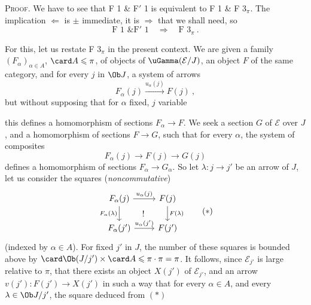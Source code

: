 \textsc{Proof}. We have to see that F 1 \& F$'$ 1 is equivalent to F 1 \& F $3_\pi$. The implication $\Longleftarrow$ is $\pm$ immediate, it is $\Longrightarrow$ that we shall need, so
\[
\text{F 1 \& F}'\text{ 1} \quad\Longrightarrow\quad \text{F } 3_\pi\ .
\]

For this, let us restate F $3_\pi$ in the present context. We are given a family $(F_\alpha)_{\alpha\in A}$, $\card A\leqslant\pi$, of objects of $\uGamma(\mathcal{E}/J)$, an object $F$ of the same category, and for every $j$ in $\Ob J$, a system of arrows
\[
F_\alpha(j) \xrightarrow{u_\alpha(j)} F(j)\ ,
\]
but without supposing that for $\alpha$ fixed, $j$ variable

this defines a homomorphism of sections $F_\alpha\longrightarrow F$. We seek a section $G$ of $\mathcal{E}$ over $J$, and a homomorphism of sections $F\longrightarrow G$, such that for every $\alpha$, the system of composites
\[
F_\alpha(j) \longrightarrow F(j) \longrightarrow G(j)
\]
defines a homomorphism of sections $F_\alpha\longrightarrow G_\alpha$. So let $\lambda : j\longrightarrow j'$ be an arrow of $J$, let us consider the squares (\textit{noncommutative}) %
\[
\begin{tikzcd}
F_\alpha(j) \arrow[r,"u_\alpha(j)"] \arrow[d,"F_\alpha(\lambda)"'] \arrow[dr,phantom,"!"] & F(j) \arrow[d,"F(\lambda)"] \\
F_\alpha(j') \arrow[r,"u_\alpha(j')"] & F(j')
\end{tikzcd}
\tag*{$(*)$}
\]
(indexed by $\alpha\in A$). For fixed $j'$ in $J$, the number of these squares is bounded above by $\card\Ob(J/j')\times\card A\leqslant\pi\cdot\pi=\pi$. It follows, since $\mathcal{E}_{j'}$ is large relative to $\pi$, that there exists an object $X(j')$ of $\mathcal{E}_{j'}$, and an arrow $v(j') : F(j')\longrightarrow X(j')$ in such a way that for every $\alpha\in A$, and every $\lambda\in\Ob J/j'$, the square deduced from $(*)$

